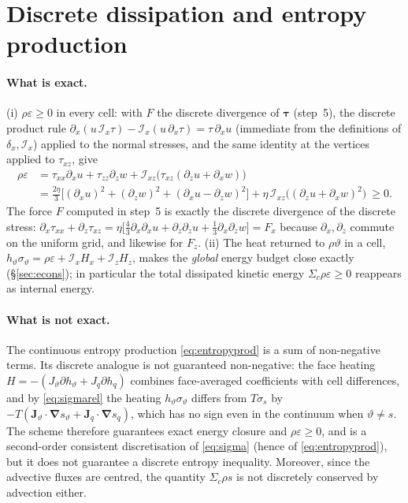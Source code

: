 \documentclass[11pt,a4paper]{article}
\newcommand{\vt}{\vartheta}                    %
\newcommand{\hth}{{h_{\vartheta}}}               %
\newcommand{\hq}{{h_q}}                          %
\newcommand{\bJ}{\mathbf{J}}
\newcommand{\bnabla}{\boldsymbol{\nabla}}
\newcommand{\btau}{\boldsymbol{\tau}}
\newcommand{\dx}{\delta_x}
\newcommand{\Ix}{\mathcal{I}_x}
\newcommand{\Iz}{\mathcal{I}_z}
\newcommand{\Ixz}{\mathcal{I}_{xz}}
\begin{document}
\section{Discrete dissipation and entropy production}
\paragraph{What is exact.} (i) $\rho\varepsilon\ge0$ in every cell: with $F$ the discrete divergence of $\btau$ (step~5), the discrete product rule $\partial_x(u\,\Ix\tau)-\Ix(u\,\partial_x\tau)=\tau\,\partial_xu$ (immediate from the definitions of $\dx,\Ix$) applied to the normal stresses, and the same identity at the vertices applied to $\tau_{xz}$, give
\begin{equation}
  \begin{split}
  \rho\varepsilon&=\tau_{xx}\partial_xu+\tau_{zz}\partial_zw+\Ixz\big(\tau_{xz}(\partial_zu+\partial_xw)\big)\\
  &=\tfrac{2\eta}{3}\Big[(\partial_xu)^2+(\partial_zw)^2+(\partial_xu-\partial_zw)^2\Big]+\eta\,\Ixz\big((\partial_zu+\partial_xw)^2\big)\ \ge0 .
  \end{split}
\end{equation}
The force $F$ computed in step~5 is exactly the discrete divergence of the discrete stress: $\partial_x\tau_{xx}+\partial_z\tau_{xz}=\eta\big[\tfrac43\partial_x\partial_xu+\partial_z\partial_zu+\tfrac13\partial_x\partial_zw\big]=F_x$ because $\partial_x,\partial_z$ commute on the uniform grid, and likewise for $F_z$.
(ii) The heat returned to $\rho\vt$ in a cell, $\hth\sigma_\vt=\rho\varepsilon+\Ix H_x+\Iz H_z$, makes the \emph{global} energy budget close exactly (\S\ref{sec:econs}); in particular the total dissipated kinetic energy $\Sigma_c\rho\varepsilon\ge0$ reappears as internal energy.

\paragraph{What is not exact.} The continuous entropy production \eqref{eq:entropyprod} is a sum of non-negative terms. Its discrete analogue is not guaranteed non-negative: the face heating $H=-(J_\vt\partial\hth+J_q\partial\hq)$ combines
face-averaged coefficients with cell differences, and by \eqref{eq:sigmarel} the heating $\hth\sigma_\vt$ differs from $T\sigma_s$ by $-T(\bJ_\vt\!\cdot\bnabla s_\vt+\bJ_q\!\cdot\bnabla s_q)$, which has no sign even in the continuum when $\vt\ne s$. The scheme therefore guarantees exact energy closure and
$\rho\varepsilon\ge0$, and is a second-order consistent discretisation of \eqref{eq:sigma} (hence of \eqref{eq:entropyprod}), but it does not guarantee a discrete entropy inequality. Moreover, since the advective fluxes are centred, the quantity $\Sigma_c\rho s$ is not discretely conserved by advection either.
\end{document}
